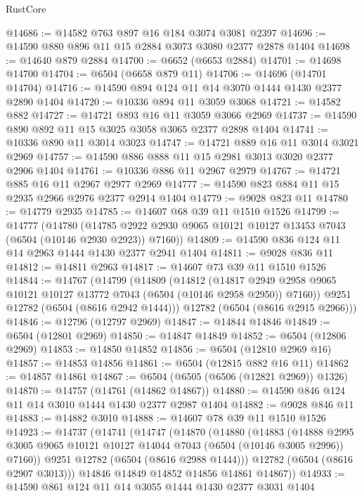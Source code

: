 \begin{lexlean}{RustCore}
\begin{coremodule}
@14686 := @14582 @763 @897 @16 @184 @3074 @3081 @2397
@14696 := @14590 @880 @896 @11 @15 @2884 @3073 @3080 @2377 @2878 @1404
@14698 := @14640 @879 @2884
@14700 := @6652 (@6653 @2884)
@14701 := @14698 @14700
@14704 := @6504 (@6658 @879 @11)
@14706 := @14696 (@14701 @14704)
@14716 := @14590 @894 @124 @11 @14 @3070 @1444 @1430 @2377 @2890 @1404
@14720 := @10336 @894 @11 @3059 @3068
@14721 := @14582 @882
@14727 := @14721 @893 @16 @11 @3059 @3066 @2969
@14737 := @14590 @890 @892 @11 @15 @3025 @3058 @3065 @2377 @2898 @1404
@14741 := @10336 @890 @11 @3014 @3023
@14747 := @14721 @889 @16 @11 @3014 @3021 @2969
@14757 := @14590 @886 @888 @11 @15 @2981 @3013 @3020 @2377 @2906 @1404
@14761 := @10336 @886 @11 @2967 @2979
@14767 := @14721 @885 @16 @11 @2967 @2977 @2969
@14777 := @14590 @823 @884 @11 @15 @2935 @2966 @2976 @2377 @2914 @1404
@14779 := @9028 @823 @11
@14780 := @14779 @2935
@14785 := @14607 @68 @39 @11 @1510 @1526
@14799 := @14777
    (@14780
      (@14785 @2922 @2930 @9065 @10121 @10127 @13453 @7043 (@6504 (@10146 @2930 @2923)) @7160))
@14809 := @14590 @836 @124 @11 @14 @2963 @1444 @1430 @2377 @2941 @1404
@14811 := @9028 @836 @11
@14812 := @14811 @2963
@14817 := @14607 @73 @39 @11 @1510 @1526
@14844 := @14767
    (@14799
      (@14809
        (@14812
          (@14817 @2949 @2958 @9065 @10121 @10127 @13772 @7043 (@6504 (@10146 @2958 @2950)) @7160))
        @9251
        @12782
        (@6504 (@8616 @2942 @1444)))
      @12782
      (@6504 (@8616 @2915 @2966)))
@14846 := @12796 (@12797 @2969)
@14847 := @14844 @14846
@14849 := @6504 (@12801 @2969)
@14850 := @14847 @14849
@14852 := @6504 (@12806 @2969)
@14853 := @14850 @14852
@14856 := @6504 (@12810 @2969 @16)
@14857 := @14853 @14856
@14861 := @6504 (@12815 @882 @16 @11)
@14862 := @14857 @14861
@14867 := @6504 (@6505 (@6506 (@12821 @2969)) @1326)
@14870 := @14757 (@14761 (@14862 @14867))
@14880 := @14590 @846 @124 @11 @14 @3010 @1444 @1430 @2377 @2987 @1404
@14882 := @9028 @846 @11
@14883 := @14882 @3010
@14888 := @14607 @78 @39 @11 @1510 @1526
@14923 := @14737
    (@14741
      (@14747
        (@14870
          (@14880
            (@14883
              (@14888
                @2995
                @3005
                @9065
                @10121
                @10127
                @14044
                @7043
                (@6504 (@10146 @3005 @2996))
                @7160))
            @9251
            @12782
            (@6504 (@8616 @2988 @1444)))
          @12782
          (@6504 (@8616 @2907 @3013)))
        @14846
        @14849
        @14852
        @14856
        @14861
        @14867))
@14933 := @14590 @861 @124 @11 @14 @3055 @1444 @1430 @2377 @3031 @1404

\end{coremodule}
\end{lexlean}
